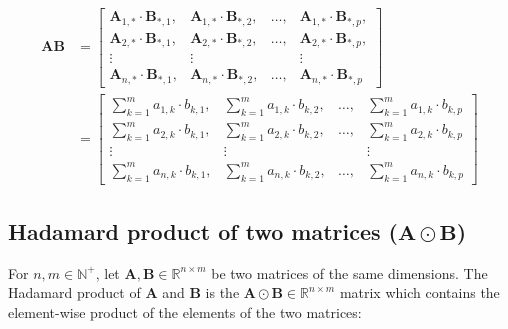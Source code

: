 \documentclass{article}
\begin{document}
        \begin{align*}
          \mathbf{AB}
            & = \begin{bmatrix}
                  \mathbf{A}_{1,*} \cdot \mathbf{B}_{*,1},
                    & \mathbf{A}_{1,*} \cdot \mathbf{B}_{*,2},
                    & \ldots,
                    & \mathbf{A}_{1,*} \cdot \mathbf{B}_{*,p}, \\
                  \mathbf{A}_{2,*} \cdot \mathbf{B}_{*,1},
                    & \mathbf{A}_{2,*} \cdot \mathbf{B}_{*,2},
                    & \ldots,
                    & \mathbf{A}_{2,*} \cdot \mathbf{B}_{*,p}, \\
                  \vdots & \vdots & & \vdots \\
                  \mathbf{A}_{n,*} \cdot \mathbf{B}_{*,1},
                    & \mathbf{A}_{n,*} \cdot \mathbf{B}_{*,2},
                    & \ldots,
                    & \mathbf{A}_{n,*} \cdot \mathbf{B}_{*,p}
                \end{bmatrix} \\
            & = \begin{bmatrix}
                  \sum_{k=1}^m a_{1,k} \cdot b_{k,1},
                    & \sum_{k=1}^m a_{1,k} \cdot b_{k,2},
                    & \ldots,
                    & \sum_{k=1}^m a_{1,k} \cdot b_{k,p} \\
                  \sum_{k=1}^m a_{2,k} \cdot b_{k,1},
                    & \sum_{k=1}^m a_{2,k} \cdot b_{k,2},
                    & \ldots,
                    & \sum_{k=1}^m a_{2,k} \cdot b_{k,p} \\
                  \vdots & \vdots & & \vdots \\
                  \sum_{k=1}^m a_{n,k} \cdot b_{k,1},
                    & \sum_{k=1}^m a_{n,k} \cdot b_{k,2},
                    & \ldots,
                    & \sum_{k=1}^m a_{n,k} \cdot b_{k,p}
                \end{bmatrix}
        \end{align*}

      \subsection{%
        Hadamard product of two matrices ($\mathbf{A} \odot \mathbf{B}$)
      }

        For $n, m \in \mathbb{N}^+$, let
        $\mathbf{A}, \mathbf{B} \in \mathbb{R}^{n \times m}$ be
        two matrices of the same dimensions. The Hadamard product of
        $\mathbf{A}$ and $\mathbf{B}$ is the
        $\mathbf{A} \odot \mathbf{B} \in \mathbb{R}^{n \times m}$ matrix which
        contains the element-wise product of the elements of the two matrices:
\end{document}
